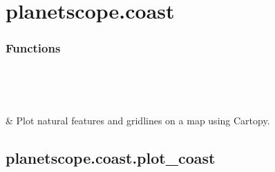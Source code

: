 \documentclass[letterpaper,10pt,english]{sphinxmanual}
\begin{document}
\begin{fulllineitems}
\begin{description}
\end{description}

\end{fulllineitems}



\section{planetscope.coast}
\label{\detokenize{_autosummary/planetscope.coast:module-planetscope.coast}}\label{\detokenize{_autosummary/planetscope.coast:planetscope-coast}}\label{\detokenize{_autosummary/planetscope.coast::doc}}\subsubsection*{Functions}


\begin{savenotes}\sphinxatlongtablestart\begin{longtable}[c]{}
\hline

\endfirsthead

%
{}\\
\hline

\endhead

\hline
{}\\
\endfoot

\endlastfoot

\sphinxAtStartPar
{\hyperref[\detokenize{_autosummary/planetscope.coast.plot_coast:planetscope.coast.plot_coast}]{}}
&
\sphinxAtStartPar
Plot natural features and gridlines on a map using Cartopy.
\\
\hline
\end{longtable}\sphinxatlongtableend\end{savenotes}


\subsection{planetscope.coast.plot\_coast}
\label{\detokenize{_autosummary/planetscope.coast.plot_coast:planetscope-coast-plot-coast}}\label{\detokenize{_autosummary/planetscope.coast.plot_coast::doc}}
\end{document}
